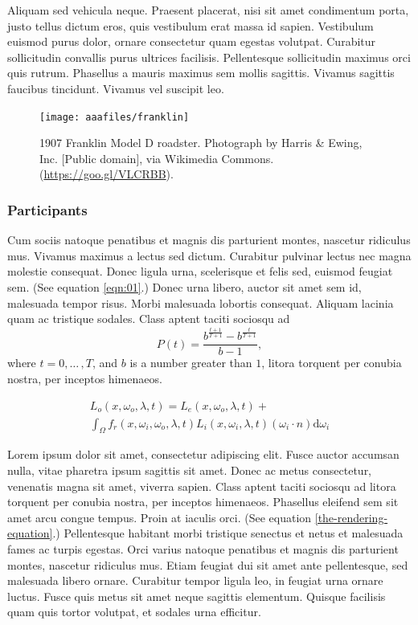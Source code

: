 \documentclass[sigconf]{acmart}
\begin{document}
Aliquam sed vehicula neque. Praesent placerat, nisi sit amet condimentum porta, justo tellus dictum eros, quis vestibulum erat massa id sapien. Vestibulum euismod purus dolor, ornare consectetur quam egestas volutpat. Curabitur sollicitudin convallis purus ultrices facilisis. Pellentesque sollicitudin maximus orci quis rutrum. Phasellus a mauris maximus sem mollis sagittis. Vivamus sagittis faucibus tincidunt. Vivamus vel suscipit leo.

\begin{figure}[h]
  \centering
  \texttt{[image: aaafiles/franklin]}
  \caption{1907 Franklin Model D roadster. Photograph by Harris \& Ewing, Inc. [Public domain], via Wikimedia Commons. (\url{https://goo.gl/VLCRBB}).}
\end{figure}

\subsubsection{Participants}

Cum sociis natoque penatibus et magnis dis parturient montes, nascetur ridiculus mus. Vivamus maximus a lectus sed dictum. Curabitur pulvinar lectus nec magna molestie consequat. Donec ligula urna, scelerisque et felis sed, euismod feugiat sem. (See equation \ref{eqn:01}.) Donec urna libero, auctor sit amet sem id, malesuada tempor risus. Morbi malesuada lobortis consequat. Aliquam lacinia quam ac tristique sodales. Class aptent taciti sociosqu ad 
\begin{equation}
\label{eqn:01}
P(t)=\frac{b^{\frac{t+1}{T+1}}-b^{\frac{t}{T+1}}}{b-1},
\end{equation}
where $t=0,{\ldots}\,,T$, and $b$ is a number greater than $1$, litora torquent per conubia nostra, per inceptos himenaeos.

\begin{multline}
\label{the-rendering-equation}
L_o(x, \omega_o, \lambda, t) = L_e(x, \omega_o, \lambda, t)  + \\
\int_{\Omega} f_r(x, \omega_i, \omega_o, \lambda, t) L_i(x, \omega_i, \lambda, t)(\omega_i \cdot n) \text{d} \omega_i
\end{multline}

Lorem ipsum dolor sit amet, consectetur adipiscing elit. Fusce auctor accumsan nulla, vitae pharetra ipsum sagittis sit amet. Donec ac metus consectetur, venenatis magna sit amet, viverra sapien. Class aptent taciti sociosqu ad litora torquent per conubia nostra, per inceptos himenaeos. Phasellus eleifend sem sit amet arcu congue tempus. Proin at iaculis orci. (See equation \ref{the-rendering-equation}.) Pellentesque habitant morbi tristique senectus et netus et malesuada fames ac turpis egestas. Orci varius natoque penatibus et magnis dis parturient montes, nascetur ridiculus mus. Etiam feugiat dui sit amet ante pellentesque, sed malesuada libero ornare. Curabitur tempor ligula leo, in feugiat urna ornare luctus. Fusce quis metus sit amet neque sagittis elementum. Quisque facilisis quam quis tortor volutpat, et sodales urna efficitur.
\end{document}
